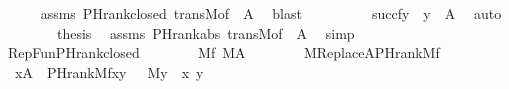 \begin{isabellebody}
\ \ \ \ \isamarkupfalse%
\ assms\ PHrank{\isacharunderscore}{\kern0pt}closed\ transM{\isacharbrackleft}{\kern0pt}of\ {\isacharunderscore}{\kern0pt}\ A{\isacharbrackright}{\kern0pt}\ \isamarkupfalse%
\ blast\isanewline
\ \ \isamarkupfalse%
\isanewline
\ \ \isamarkupfalse%
\ {\isachardoublequoteopen}\ {\isachardot}{\kern0pt}{\isachardot}{\kern0pt}{\isachardot}{\kern0pt}\ {\isacharequal}{\kern0pt}\ {\isacharbraceleft}{\kern0pt}succ{\isacharparenleft}{\kern0pt}f{\isacharbackquote}{\kern0pt}y{\isacharparenright}{\kern0pt}\ {\isachardot}{\kern0pt}\ y\ {\isasymin}\ A{\isacharbraceright}{\kern0pt}{\isachardoublequoteclose}\ \isamarkupfalse%
\ auto\isanewline
\ \ \isamarkupfalse%
\ \isanewline
\ \ \isamarkupfalse%
\ {\isacharquery}{\kern0pt}thesis\ \isamarkupfalse%
\ assms\ PHrank{\isacharunderscore}{\kern0pt}abs\ transM{\isacharbrackleft}{\kern0pt}of\ {\isacharunderscore}{\kern0pt}\ A{\isacharbrackright}{\kern0pt}\ \isamarkupfalse%
\ simp\isanewline
{}\isamarkupfalse%
%
\endisatagproof
{\isafoldproof}%
%
\isadelimproof
\isanewline
%
\endisadelimproof
\isanewline
{}\isamarkupfalse%
\ RepFun{\isacharunderscore}{\kern0pt}PHrank{\isacharunderscore}{\kern0pt}closed\ {\isacharcolon}{\kern0pt}\isanewline
\ \ \isanewline
\ \ \ \ {\isachardoublequoteopen}M{\isacharparenleft}{\kern0pt}f{\isacharparenright}{\kern0pt}{\isachardoublequoteclose}\ {\isachardoublequoteopen}M{\isacharparenleft}{\kern0pt}A{\isacharparenright}{\kern0pt}{\isachardoublequoteclose}\ \isanewline
\ \ \isanewline
\ \ \ \ {\isachardoublequoteopen}M{\isacharparenleft}{\kern0pt}Replace{\isacharparenleft}{\kern0pt}A{\isacharcomma}{\kern0pt}PHrank{\isacharparenleft}{\kern0pt}M{\isacharcomma}{\kern0pt}f{\isacharparenright}{\kern0pt}{\isacharparenright}{\kern0pt}{\isacharparenright}{\kern0pt}{\isachardoublequoteclose}\isanewline
%
\isadelimproof
%
\endisadelimproof
%
\isatagproof
{}\isamarkupfalse%
\ {\isacharminus}{\kern0pt}\isanewline
\ \ \isamarkupfalse%
\ {\isachardoublequoteopen}{\isasymlbrakk}\ x{\isasymin}A\ {\isacharsemicolon}{\kern0pt}\ PHrank{\isacharparenleft}{\kern0pt}M{\isacharcomma}{\kern0pt}f{\isacharcomma}{\kern0pt}x{\isacharcomma}{\kern0pt}y{\isacharparenright}{\kern0pt}\ {\isasymrbrakk}\ {\isasymLongrightarrow}\ M{\isacharparenleft}{\kern0pt}y{\isacharparenright}{\kern0pt}{\isachardoublequoteclose}\ \ x\ y\isanewline
\ \ \ \ \isamarkupfalse%

\end{isabellebody}
